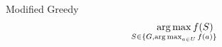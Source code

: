 \begin{frame}{Modified Greedy}
    $$
    \argmax_{\mathclap{S \in \{G, \argmax_{a \in U}f(a)\}}}f(S)
    $$
\end{frame}